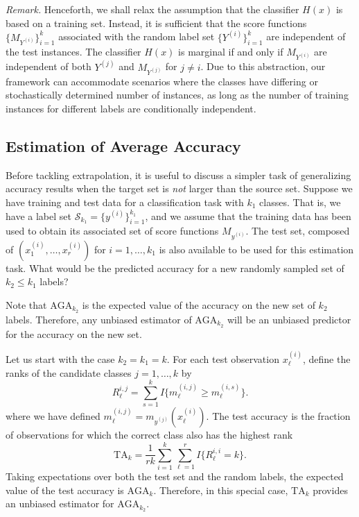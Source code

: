 \documentclass[twoside,11pt]{article}
\begin{document}
\emph{Remark.}  Henceforth, we shall relax the assumption
that the classifier $H(x)$ is based on a training set.  Instead, it is sufficient 
that the score functions $\{M_{Y^{(i)}}\}_{i=1}^k$ associated with the random label set $\{Y^{(i)}\}_{i=1}^k$
are independent of the test instances. The classifier $H(x)$ is marginal if and only if $M_{Y^{(i)}}$ are
independent of both $Y^{(j)}$ and $M_{Y^{(j)}}$ for $j \neq i$. Due to this abstraction, 
our framework can accommodate scenarios where the classes have differing or stochastically determined number of instances, as long as the number of training instances for different labels are conditionally independent. %

\subsection{Estimation of Average Accuracy}\label{sec:estimation_average_accuracy}

Before tackling extrapolation, it is useful to discuss a simpler task of generalizing accuracy results when the target set is \emph{not} larger than the source set. Suppose we have training and test data for a classification task with $k_1$
classes.  
That is, we have a label set $\mathcal{S}_{k_1} =
\{y^{(i)}\}_{i=1}^{k_1}$, and
we assume that the training data has been used to obtain its associated set of score functions
$M_{y^{(i)}}$.
The test set, composed of $(x_1^{(i)},\hdots,
x_{r}^{(i)})$ for $i = 1,\hdots, k_1$ is also available to be used for this estimation task.  
What would be the predicted
accuracy for a new randomly sampled set of $k_2 \leq k_1$ labels?

Note that $\text{AGA}_{k_2}$ is the expected value of the accuracy on
the new set of $k_2$ labels.  Therefore, any unbiased estimator of
$\text{AGA}_{k_2}$ will be an unbiased predictor for the accuracy on
the new set.

Let us start with the case $k_2 = k_1 = k$.  For each test observation
$x_\ell^{(i)}$, define the ranks of the candidate classes $j =
1,\hdots, k$ by
\[
R_{\ell}^{i, j} = \sum_{s = 1}^k I\{m^{(i,j)}_\ell \geq m^{(i,s)}_\ell\}.
\]
where we have defined $m^{(i, j)}_\ell = m_{y^{(j)}}(x_\ell^{(i)})$.
The test accuracy is the fraction of observations for which the
correct class also has the highest rank
\begin{equation}\label{eq:test_risk}
\text{TA}_k = \frac{1}{r k} \sum_{i=1}^{k} \sum_{\ell=1}^{r} I\{R_\ell^{i,i} = k\}.
\end{equation}
Taking expectations over both the test set and the random labels, the
expected value of the test accuracy is $\text{AGA}_k$.  Therefore, in this special case, $\text{TA}_k$ provides an unbiased estimator for $\text{AGA}_{k_2}$.
\end{document}
